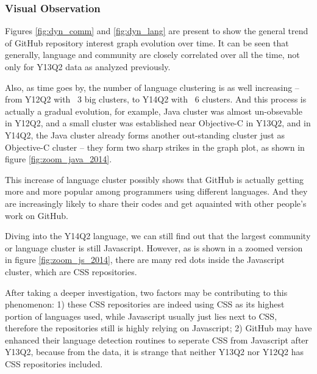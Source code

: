 \documentclass[11pt]{article}
\begin{document}
\subsubsection{Visual Observation}

Figures \ref{fig:dyn_comm} and \ref{fig:dyn_lang} are present to show the general trend of GitHub repository interest graph evolution over time.
It can be seen that generally, language and community are closely correlated over all the time, not only for Y13Q2 data as analyzed previously.

Also, as time goes by, the number of language clustering is as well increasing -- from Y12Q2 with ~3 big clusters, to Y14Q2 with ~6 clusters. 
And this process is actually a gradual evolution, for example, Java cluster was almost un-obsevable in Y12Q2, and a small cluster was established near Objective-C in Y13Q2, and in Y14Q2, the Java cluster already forms another out-standing cluster just as Objective-C cluster -- they form two sharp strikes in the graph plot, as shown in figure \ref{fig:zoom_java_2014}. 

This increase of language cluster possibly shows that GitHub is actually getting more and more popular among programmers using different languages. And they are increasingly likely to share their codes and get aquainted with other people's work on GitHub.


Diving into the Y14Q2 language, we can still find out that the largest community or language cluster is still Javascript. However, as is shown in a zoomed version in figure \ref{fig:zoom_js_2014}, there are many red dots inside the Javascript cluster, which are CSS repositories. 

After taking a deeper investigation, two factors may be contributing to this phenomenon: 
1) these CSS repositories are indeed using CSS as its highest portion of languages used, while Javascript usually just lies next to CSS, therefore the repositories still is highly relying on Javascript; 2) GitHub may have enhanced their language detection routines to seperate CSS from Javascript after Y13Q2, because from the data, it is strange that neither Y13Q2 nor Y12Q2 has CSS repositories included.
\end{document}
